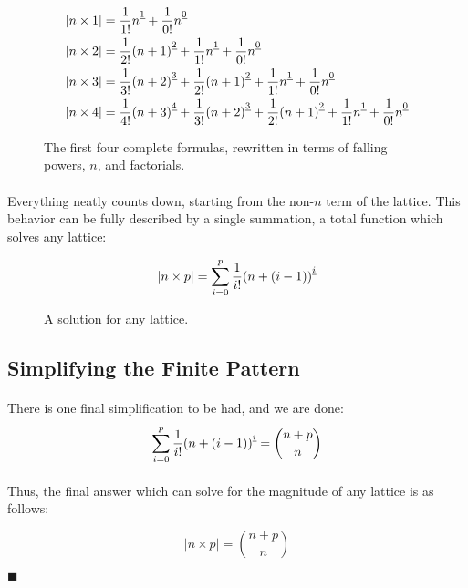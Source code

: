 \documentclass[12pt]{article}
\newcommand{\p}{\paragraph{}}
\newcommand{\fall}[1]{\strut^{\underline{#1}}}
\begin{document}
			\begin{figure}[h]
				\begin{align*}
				|n\times1| &= \frac{1}{1!}n\fall{1} + \frac{1}{0!}n\fall{0}\\
				|n\times2| &= \frac{1}{2!}(n+1)\fall{2} + \frac{1}{1!}n\fall{1} + \frac{1}{0!}n\fall{0} \\
				|n\times3| &= \frac{1}{3!}(n+2)\fall{3} + \frac{1}{2!}(n+1)\fall{2} + \frac{1}{1!}n\fall{1} + \frac{1}{0!}n\fall{0} \\
				|n\times4| &= \frac{1}{4!}(n+3)\fall{4} + \frac{1}{3!}(n+2)\fall{3} + \frac{1}{2!}(n+1)\fall{2} + \frac{1}{1!}n\fall{1} + \frac{1}{0!}n\fall{0}
				\end{align*}
				
				\caption{The first four complete formulas, rewritten in terms of falling powers, $n$, and factorials.}
			\end{figure}
			\newpage
		
			\p Everything neatly counts down, starting from the non-$n$ term of the lattice. This behavior can be fully described by a single summation, a total function which solves any lattice:
			
			\begin{figure}[h]
				\begin{equation*}
					|n\times p| = \sum_{i=0}^{p}\frac{1}{i!}(n+(i-1))\fall{i}
				\end{equation*}
				
				\caption{A solution for any lattice.}
			\end{figure}
		
		\newpage
		\subsection{Simplifying the Finite Pattern}
		
			\p There is one final simplification to be had, and we are done:
			\begin{equation*}
				\sum_{i=0}^{p}\frac{1}{i!}(n+(i-1))\fall{i} = {n + p \choose n}
			\end{equation*}
			
			\p Thus, the final answer which can solve for the magnitude of any lattice is as follows:
			
			\begin{equation*}
				|n\times p| = {n+p \choose n}
			\end{equation*}
			
			\hfill $\blacksquare$
\end{document}
